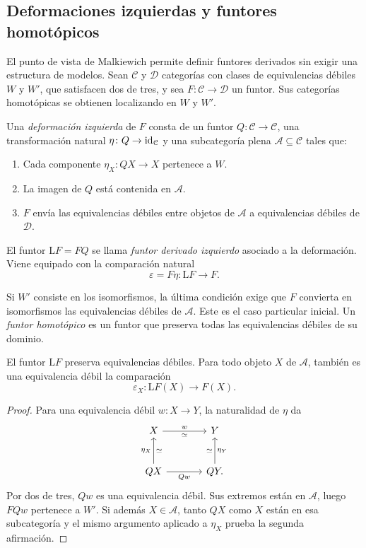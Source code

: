 \subsection{Deformaciones izquierdas y funtores homotópicos}

El punto de vista de Malkiewich permite definir funtores derivados sin exigir una estructura de modelos. Sean $\mathcal C$ y $\mathcal D$ categorías con clases de equivalencias débiles $W$ y $W'$, que satisfacen dos de tres, y sea $F\colon\mathcal C\to\mathcal D$ un funtor. Sus categorías homotópicas se obtienen localizando en $W$ y $W'$.

\begin{defi}
Una \emph{deformación izquierda} de $F$ consta de un funtor $Q\colon\mathcal C\to\mathcal C$, una transformación natural $\eta\colon Q\to\operatorname{id}_{\mathcal C}$ y una subcategoría plena $\mathcal A\subseteq\mathcal C$ tales que:
\begin{enumerate}
\item Cada componente $\eta_X\colon QX\to X$ pertenece a $W$.
\item La imagen de $Q$ está contenida en $\mathcal A$.
\item $F$ envía las equivalencias débiles entre objetos de $\mathcal A$ a equivalencias débiles de $\mathcal D$.
\end{enumerate}
El funtor $\mathrm LF=FQ$ se llama \emph{funtor derivado izquierdo} asociado a la deformación. Viene equipado con la comparación natural
\[
\varepsilon=F\eta\colon\mathrm LF\longrightarrow F.
\]
\end{defi}

Si $W'$ consiste en los isomorfismos, la última condición exige que $F$ convierta en isomorfismos las equivalencias débiles de $\mathcal A$. Este es el caso particular inicial. Un \emph{funtor homotópico} es un funtor que preserva todas las equivalencias débiles de su dominio.

\begin{prop}\label{prop:c16-deformacion-homotopica}
El funtor $\mathrm LF$ preserva equivalencias débiles. Para todo objeto $X$ de $\mathcal A$, también es una equivalencia débil la comparación
\[
\varepsilon_X\colon\mathrm LF(X)\longrightarrow F(X).
\]
\end{prop}

\begin{proof}
Para una equivalencia débil $w\colon X\to Y$, la naturalidad de $\eta$ da
\[
\begin{tikzcd}[column sep=large,row sep=large]
X\arrow[r,"w","\simeq"']&Y\\
QX\arrow[u,"\eta_X","\simeq"']\arrow[r,"Qw"']&QY\arrow[u,"\eta_Y"',"\simeq"] .
\end{tikzcd}
\]
Por dos de tres, $Qw$ es una equivalencia débil. Sus extremos están en $\mathcal A$, luego $FQw$ pertenece a $W'$. Si además $X\in\mathcal A$, tanto $QX$ como $X$ están en esa subcategoría y el mismo argumento aplicado a $\eta_X$ prueba la segunda afirmación.
\end{proof}

